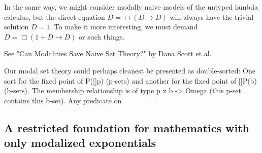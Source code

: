\begin{TODOblock}
In the same way, we might consider modally naive models of the untyped lambda calculus, but the direct equation $D = \Box(D \to D)$ will always have the trivial solution $D = 1$. To make it more interesting, we must demand $D = \Box(1 + D \to D)$ or such things.

See "Can Modalities Save Naive Set Theory?" by Dana Scott et al.

Our modal set theory could perhaps cleanest be presented as double-sorted: One sort for the fixed point of P([]p) (p-sets) and another for the fixed point of []P(b) (b-sets). The membership relationship is of type p x b -> Omega (this p-set contains this b-set). Any predicate on 
\end{TODOblock}

\subsection{A restricted foundation for mathematics with only modalized exponentials}
\TODO

\fileend